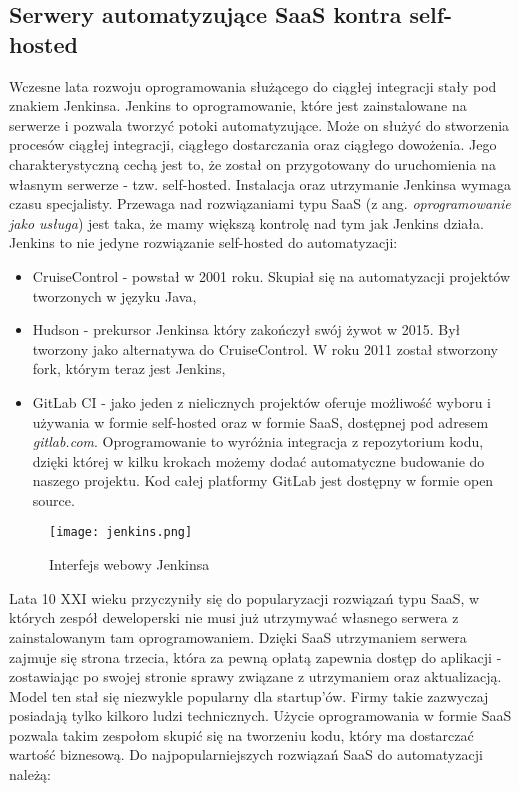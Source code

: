 \subsection{Serwery automatyzujące SaaS kontra self-hosted}
Wczesne lata rozwoju oprogramowania służącego do ciągłej integracji stały pod znakiem Jenkinsa. Jenkins to oprogramowanie, które jest zainstalowane na serwerze i pozwala tworzyć potoki automatyzujące. Może on służyć do stworzenia procesów ciągłej integracji, ciągłego dostarczania oraz ciągłego dowożenia. Jego charakterystyczną cechą jest to, że został on przygotowany do uruchomienia na własnym serwerze - tzw. self-hosted. Instalacja oraz utrzymanie Jenkinsa wymaga czasu specjalisty. Przewaga nad rozwiązaniami typu SaaS (z ang. \textit{oprogramowanie jako usługa}) jest taka, że mamy większą kontrolę nad tym jak Jenkins działa.
Jenkins to nie jedyne rozwiązanie self-hosted do automatyzacji:
\begin{itemize}
    \item CruiseControl - powstał w 2001 roku. Skupiał się na automatyzacji projektów tworzonych w języku Java,
    \item Hudson - prekursor Jenkinsa który zakończył swój żywot w 2015. Był tworzony jako alternatywa do CruiseControl. W roku 2011 został stworzony fork, którym teraz jest Jenkins,
    \item GitLab CI - jako jeden z nielicznych projektów oferuje możliwość wyboru i używania w formie self-hosted oraz w formie SaaS, dostępnej pod adresem \textit{gitlab.com}. Oprogramowanie to wyróżnia integracja z repozytorium kodu, dzięki której w kilku krokach możemy dodać automatyczne budowanie do naszego projektu. Kod całej platformy GitLab jest dostępny w formie open source.
\end{itemize}
\begin{figure}[htbp]
    \centering
    \texttt{[image: jenkins.png]}
    \caption{Interfejs webowy Jenkinsa}
    \label{fig:jenkins}
\end{figure}
\par
Lata 10 XXI wieku przyczyniły się do popularyzacji rozwiązań typu SaaS, w których zespół deweloperski nie musi już utrzymywać własnego serwera z zainstalowanym tam oprogramowaniem. Dzięki SaaS utrzymaniem serwera zajmuje się strona trzecia, która za pewną opłatą zapewnia dostęp do aplikacji - zostawiając po swojej stronie sprawy związane z utrzymaniem oraz aktualizacją. Model ten stał się niezwykle popularny dla startup'ów. Firmy takie zazwyczaj posiadają tylko kilkoro ludzi technicznych. Użycie oprogramowania w formie SaaS pozwala takim zespołom skupić się na tworzeniu kodu, który ma dostarczać wartość biznesową. Do najpopularniejszych rozwiązań SaaS do automatyzacji należą:
